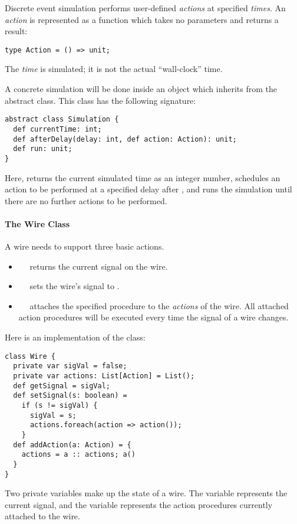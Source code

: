 {Discrete event simulation performs user-defined \emph{actions} at
specified \emph{times}.  
An {\em action} is represented as a function which takes no parameters and
returns a  result:
\begin{lstlisting}
type Action = () => unit;
\end{lstlisting}
The \emph{time} is simulated; it is not the actual ``wall-clock'' time.

A concrete simulation will be done inside an object which inherits
from the abstract  class. This class has the following
signature:

\begin{lstlisting}
abstract class Simulation {
  def currentTime: int;
  def afterDelay(delay: int, def action: Action): unit;
  def run: unit;
}
\end{lstlisting}
Here,
 returns the current simulated time as an integer
number,
 schedules an action to be performed at a specified
delay after , and
 runs the simulation until there are no further actions to be 
performed.

\paragraph{The Wire Class}
A wire needs to support three basic actions.
\begin{itemize}
\item[]
~~ returns the current signal on the wire.
\item[]
~~ sets the wire's signal to .
\item[]
~~ attaches the specified procedure
 to the {\em actions} of the wire. All attached action
procedures will be executed every time the signal of a wire changes.
\end{itemize}
Here is an implementation of the  class:
\begin{lstlisting}
class Wire {
  private var sigVal = false;
  private var actions: List[Action] = List();
  def getSignal = sigVal;
  def setSignal(s: boolean) = 
    if (s != sigVal) {
      sigVal = s;
      actions.foreach(action => action()); 
    }
  def addAction(a: Action) = {
    actions = a :: actions; a()
  }
}
\end{lstlisting}
Two private variables make up the state of a wire.  The variable
 represents the current signal, and the variable
 represents the action procedures currently attached to
the wire.

}

